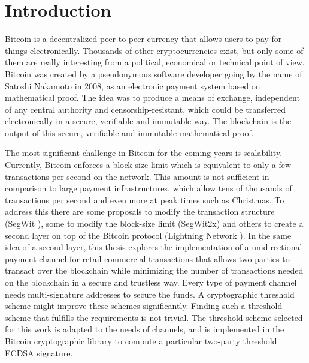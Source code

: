 \chapter{Introduction}
\label{chap:introduction}

Bitcoin is a decentralized peer-to-peer currency that allows users to pay for
things electronically. Thousands of other cryptocurrencies exist, but only some
of them are really interesting from a political, economical or technical point
of view. Bitcoin was created by a pseudonymous software developer going by the
name of Satoshi Nakamoto in 2008, as an electronic payment system based on
mathematical proof. The idea was to produce a means of exchange, independent of
any central authority and censorship-resistant, which could be transferred
electronically in a secure, verifiable and immutable way. The blockchain is the
output of this secure, verifiable and immutable mathematical proof.

The most significant challenge in Bitcoin for the coming years is scalability.
Currently, Bitcoin enforces a block-size limit which is equivalent to only a few
transactions per second on the network. This amount is not sufficient in
comparison to large payment infrastructures, which allow tens of thousands of
transactions per second and even more at peak times such as Christmas.  To
address this there are some proposals to modify the transaction structure (SegWit \cite{SegWitBIP}),
some to modify the block-size limit (SegWit2x) and others to
create a second layer on top of the Bitcoin protocol (Lightning Network \cite{poon2016bitcoin}).
In the same idea of a second layer, this thesis explores the
implementation of a unidirectional payment channel for retail commercial
transactions that allows two parties to
transact over the blockchain while minimizing the number of transactions needed
on the blockchain in a secure and trustless way. Every type of payment channel needs
multi-signature addresses to secure the funds. A cryptographic threshold scheme
might improve these schemes significantly. Finding such a threshold scheme that
fulfills the requirements is not trivial. The threshold scheme selected for this work is
adapted to the needs of channels, and is implemented in the Bitcoin cryptographic
library to compute a particular two-party threshold ECDSA signature.


